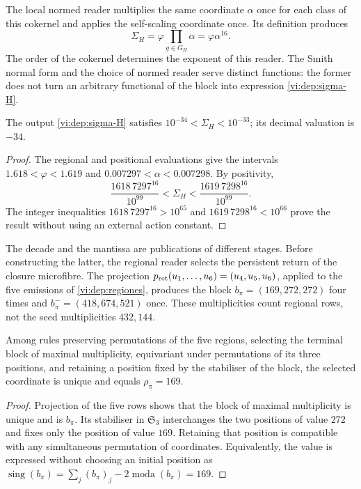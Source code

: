 The local normed reader multiplies the same coordinate \(\alpha\)
once for each class of this cokernel and applies the self-scaling
coordinate once. Its definition produces
\begin{equation}
 \Sigma_H=\varphi\prod_{g\in G_H}\alpha
         =\varphi\alpha^{16}.
 \label{vi:dep:sigma-H}
\end{equation}
The order of the cokernel determines the exponent of this reader. The Smith
normal form and the choice of normed reader serve distinct
functions: the former does not turn an arbitrary functional of the block into
expression \eqref{vi:dep:sigma-H}.

\begin{proposition}
\label{vi:dep:decada}
The output \eqref{vi:dep:sigma-H} satisfies
\(10^{-34}<\Sigma_H<10^{-33}\); its decimal valuation is \(-34\).
\end{proposition}
\begin{proof}
The regional and positional evaluations give the intervals
\(1.618<\varphi<1.619\) and \(0.007297<\alpha<0.007298\).
By positivity,
\[
 \frac{1618\,7297^{16}}{10^{99}}
 <\Sigma_H<
 \frac{1619\,7298^{16}}{10^{99}}.
\]
The integer inequalities
\(1618\,7297^{16}>10^{65}\) and
\(1619\,7298^{16}<10^{66}\) prove the result without using an
external action constant.
\end{proof}

The decade and the mantissa are publications of different stages.
Before constructing the latter, the regional reader selects the persistent
return of the closure microfibre. The projection
\(p_{\rm ret}(u_1,\ldots,u_6)=(u_4,u_5,u_6)\), applied to the
five emissions of \ref{vi:dep:regiones}, produces the block
\(b_\pi=(169,272,272)\) four times and
\(b_\pi^-=(418,674,521)\) once. These multiplicities count
regional rows, not the seed multiplicities \(432,144\).

\begin{proposition}
\label{vi:dep:selector169}
Among rules preserving permutations of the five regions,
selecting the terminal block of maximal multiplicity, equivariant
under permutations of its three positions, and retaining a position fixed
by the stabiliser of the block, the selected coordinate is unique
and equals \(\rho_\pi=169\).
\end{proposition}
\begin{proof}
Projection of the five rows shows that the block of maximal
multiplicity is unique and is \(b_\pi\). Its stabiliser in
\(\mathfrak S_3\) interchanges the two positions of value \(272\)
and fixes only the position of value \(169\). Retaining that position
is compatible with any simultaneous permutation of coordinates.
Equivalently, the value is expressed without choosing an initial position
as
\(\operatorname{sing}(b_\pi)=\sum_j(b_\pi)_j
-2\operatorname{moda}(b_\pi)=169\).
\end{proof}

